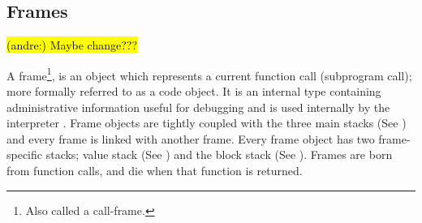 \documentclass[12pt, a4paper]{report}
\DeclareRobustCommand{\andre}[1]{ {\begingroup\sethlcolor{BurntOrange}\hl{(andre:) #1}\endgroup} }
\theoremstyle{definition}
\theoremstyle{definition}%
\theoremstyle{definition}%
\theoremstyle{definition}%
\theoremstyle{definition}%
\theoremstyle{definition}%
\begin{document}
{        \subsection{Frames}
        \label{subsec:frames}
        \andre{Maybe change???}
        \par A frame\footnote{\label{footnote:call-frame_def}Also called a call-frame.}, is an object which represents a current function call (subprogram call); more formally referred to as a code object. It is an internal type containing administrative information useful for debugging and is used internally
        by the interpreter \cite[pp.18--19]{van1994python}. Frame objects are tightly coupled with the three main stacks (See {\bfseries{}}) and every frame is linked with another frame. Every frame object has two frame-specific stacks;
        value stack (See {\bfseries{}}) and the block stack (See {\bfseries{}}). Frames are born from function calls, and die when that function is returned.
        
}
\end{document}
